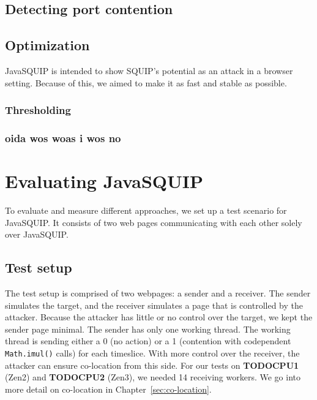 \documentclass[11pt,
  titlepage=false,
]{scrreprt}
\begin{document}
\section{Detecting port contention}

\section{Optimization}
JavaSQUIP is intended to show SQUIP's potential as an attack in a browser setting.
Because of this, we aimed to make it as fast and stable as possible.

\subsection{Thresholding}

\subsection{oida wos woas i wos no}

\chapter{Evaluating JavaSQUIP}
\label{ch:evaluation}

To evaluate and measure different approaches, we set up a test scenario for JavaSQUIP.
It consists of two web pages communicating with each other solely over JavaSQUIP.

\section {Test setup}
\label{sec:testsetup}
The test setup is comprised of two webpages: a sender and a receiver.
The sender simulates the target, and the receiver simulates a page that is controlled by the attacker.
Because the attacker has little or no control over the target, we kept the sender page minimal.
The sender has only one working thread.
The working thread is sending either a 0 (no action) or a 1 (contention with codependent \texttt{Math.imul()} calls) for each timeslice.
With more control over the receiver, the attacker can ensure co-location from this side.
For our tests on \textbf{TODOCPU1} (Zen2) and \textbf{TODOCPU2} (Zen3), we needed 14 receiving workers.
We go into more detail on co-location in Chapter~\ref{sec:co-location}.
\end{document}
